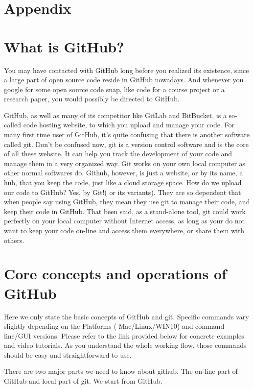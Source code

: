 \documentclass[12pt, fullpage,letterpaper]{article}
\begin{document}
\pagebreak
\section*{Appendix}
\section*{What is GitHub?}
You may have contacted with GitHub long before you realized its existence, since a large part of open source code reside in GitHub nowadays. And whenever you google for some open source code snap, like code for a course project or a research paper, you would possibly be directed to GitHub. 

GitHub, as well as  many of its competitor like GitLab and BitBucket, is a so-called code hosting website, to which you upload and manage your code. For many first time user of GitHub, it's quite confusing that there is another software called git. Don't be confused now, git is a version control software and is the core of all these website. It can help you track the development of your code and manage them in a very organized way. Git works on your own local computer as other normal softwares do. Github, however, is just a website, or by its name, a hub, that you keep the code, just like a cloud storage space. How do we upload our code to GitHub? Yes, by Git!( or its variants). They are so dependent that when people say using GitHub, they mean they use git to manage their code, and keep their code in GitHub. That been said, as a stand-alone tool, git could  work perfectly on your local computer without Internet access, as long as your do not want to keep your code on-line and access them everywhere, or share them with others. 



\section*{Core concepts and operations of GitHub}
Here we only state the basic concepts of GitHub and git. Specific commands vary slightly depending on the Platforms ( Mac/Linux/WIN10) and command-line/GUI versions. Please refer to the link provided below for concrete examples and video tutorials. As you understand the whole working flow, those commands should be easy and straightforward to use. 

There are two major parts we need to know about github. The on-line part of GitHub and local part of git. We start from GitHub.
\end{document}
